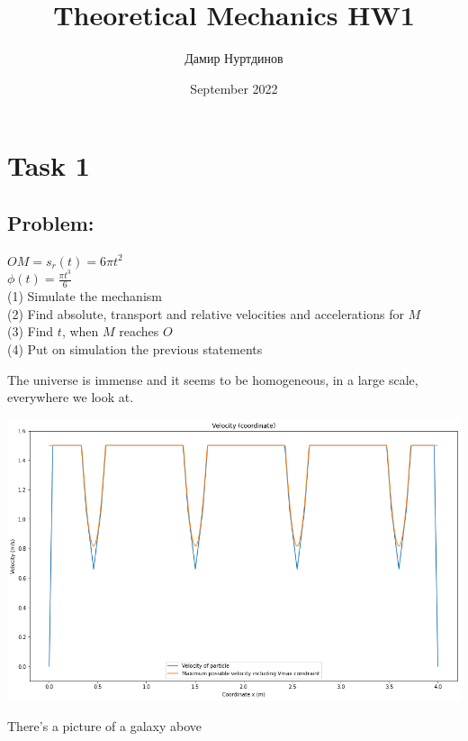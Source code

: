 \documentclass[a4paper,11pt,oneside,article]{memoir}
\title{Theoretical Mechanics HW1}
\author{Дамир Нуртдинов}
\date{September 2022}
\begin{document}
\section*{Task 1}
\subsection{Problem:}
$OM = s_r(t) = 6 \pi t^2$\\
$\phi (t) = \frac{\pi t^3}{6}$\\
(1) Simulate the mechanism\\
(2) Find absolute, transport and relative velocities and accelerations for $M$\\
(3) Find $t$, when $M$ reaches $O$ \\
(4) Put on simulation the previous statements



The universe is immense and it seems to be homogeneous, 
in a large scale, everywhere we look at.

\includegraphics{images/vel_coord.png}


There's a picture of a galaxy above
\end{document}
